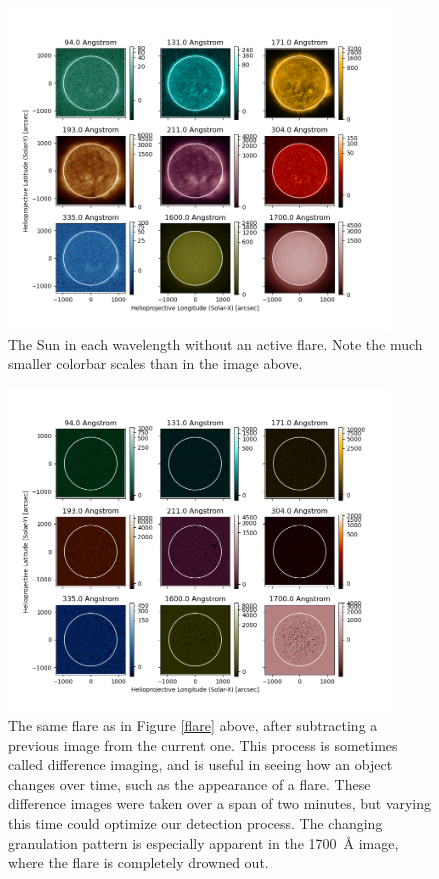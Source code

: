 \documentclass[12pt, letterpaper]{article}
\begin{document}
\begin{figure}[ht]
	\includegraphics[width=0.9\textwidth]{figures/noflare.png}
	\centering
	\caption{The Sun in each wavelength without an active flare. Note the much smaller colorbar scales than in the image above.}
	\label{noflare}
\end{figure}

\begin{figure}[ht]
	\includegraphics[width=0.9\textwidth]{figures/0819_flare_diff.png}
	\centering
	\caption{The same flare as in Figure \ref{flare} above, after subtracting a previous image from the current one. This process is sometimes called difference imaging, and is useful in seeing how an object changes over time, such as the appearance of a flare. These difference images were taken over a span of two minutes, but varying this time could optimize our detection process. The changing granulation pattern is especially apparent in the 1700~\AA{} image, where the flare is completely drowned out.}
	\label{flare_diff}
\end{figure}
\end{document}
